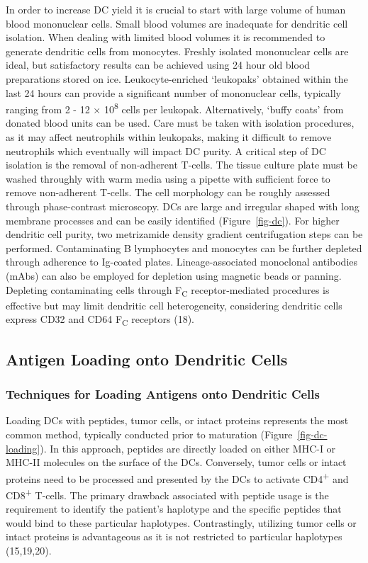 \documentclass[
]{article}
\begin{document}
In order to increase DC yield it is crucial to start with large volume
of human blood mononuclear cells. Small blood volumes are inadequate for
dendritic cell isolation. When dealing with limited blood volumes it is
recommended to generate dendritic cells from monocytes. Freshly isolated
mononuclear cells are ideal, but satisfactory results can be achieved
using 24 hour old blood preparations stored on ice. Leukocyte-enriched
`leukopaks' obtained within the last 24 hours can provide a significant
number of mononuclear cells, typically ranging from 2 - 12 ×
10\textsuperscript{8} cells per leukopak. Alternatively, `buffy coats'
from donated blood units can be used. Care must be taken with isolation
procedures, as it may affect neutrophils within leukopaks, making it
difficult to remove neutrophils which eventually will impact DC purity.
A critical step of DC isolation is the removal of non-adherent T-cells.
The tissue culture plate must be washed throughly with warm media using
a pipette with sufficient force to remove non-adherent T-cells. The cell
morphology can be roughly assessed through phase-contrast microscopy.
DCs are large and irregular shaped with long membrane processes and can
be easily identified (Figure~\ref{fig-dc}). For higher dendritic cell
purity, two metrizamide density gradient centrifugation steps can be
performed. Contaminating B lymphocytes and monocytes can be further
depleted through adherence to Ig-coated plates. Lineage-associated
monoclonal antibodies (mAbs) can also be employed for depletion using
magnetic beads or panning. Depleting contaminating cells through
F\textsubscript{C} receptor-mediated procedures is effective but may
limit dendritic cell heterogeneity, considering dendritic cells express
CD32 and CD64 F\textsubscript{C} receptors (18).

\subsection{Antigen Loading onto Dendritic
Cells}\label{antigen-loading-onto-dendritic-cells}

\subsubsection{Techniques for Loading Antigens onto Dendritic
Cells}\label{techniques-for-loading-antigens-onto-dendritic-cells}

Loading DCs with peptides, tumor cells, or intact proteins represents
the most common method, typically conducted prior to maturation
(Figure~\ref{fig-dc-loading}). In this approach, peptides are directly
loaded on either MHC-I or MHC-II molecules on the surface of the DCs.
Conversely, tumor cells or intact proteins need to be processed and
presented by the DCs to activate CD4\textsuperscript{+} and
CD8\textsuperscript{+} T-cells. The primary drawback associated with
peptide usage is the requirement to identify the patient's haplotype and
the specific peptides that would bind to these particular haplotypes.
Contrastingly, utilizing tumor cells or intact proteins is advantageous
as it is not restricted to particular haplotypes (15,19,20).
\end{document}
